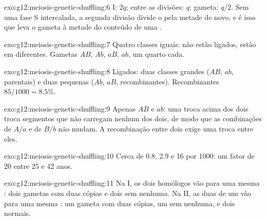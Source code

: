 \begin{solution}{exo:g12:meiosis-genetic-shuffling:6}
 I: $2q$; entre as divisões: $q$; gameta: $q/2$. Sem uma fase S
intercalada, a segunda divisão divide o  pela metade de novo, e é
isso que leva o gameta à metade do conteúdo de uma  .
\end{solution}

\begin{solution}{exo:g12:meiosis-genetic-shuffling:7}
Quatro classes iguais: não estão ligados, estão em 
diferentes. Gametas $AB$, $Ab$, $aB$, $ab$, um quarto cada.
\end{solution}

\begin{solution}{exo:g12:meiosis-genetic-shuffling:8}
Ligados: duas classes grandes ($AB$, $ab$, parentais) e duas pequenas
($Ab$, $aB$, recombinantes). Recombinantes $85/1000 = 8.5\%$.
\end{solution}

\begin{solution}{exo:g12:meiosis-genetic-shuffling:9}
Apenas $AB$ e $ab$: uma troca acima dos dois  troca segmentos que
não carregam nenhum dos dois, de modo que as combinações de $A/a$ e de
$B/b$ não mudam. A recombinação entre dois  exige uma troca entre
eles.
\end{solution}

\begin{solution}{exo:g12:meiosis-genetic-shuffling:10}
Cerca de 0.8, 2.9 e 16 por 1000: um fator de 20 entre 25 e 42 anos.
\end{solution}

\begin{solution}{exo:g12:meiosis-genetic-shuffling:11}
Na  I, os dois homólogos vão para uma mesma : dois gametas
com duas cópias e dois sem nenhuma. Na  II, as duas  de
um  vão para uma mesma : um gameta com duas cópias, um
sem nenhuma, e dois normais.
\end{solution}

